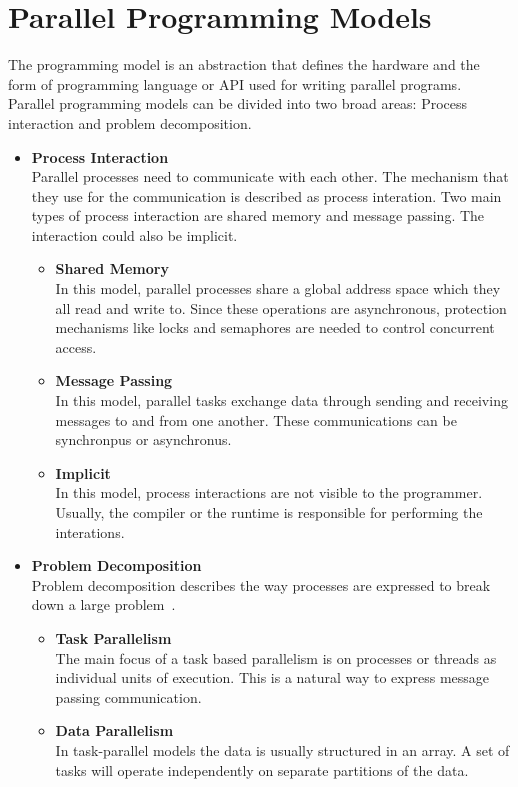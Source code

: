 \section{Parallel Programming Models}
The programming model is an abstraction that defines the hardware and the form of programming language or API used for writing parallel programs.
Parallel programming models can be divided into two broad areas: Process interaction and problem decomposition.~\cite{parallelprogrammingmodels}
\begin{itemize}
\item \textbf{Process Interaction}\\
  Parallel processes need to communicate with each other. The mechanism that they use for the communication is described as process interation. Two main types of process interaction are shared memory and message passing. The interaction could also be implicit.
  \begin{itemize}
  \item \textbf{Shared Memory}\\
    In this model, parallel processes share a global address space which they all read and write to. Since these operations are asynchronous, protection mechanisms like locks and semaphores are needed to control concurrent access.
  \item \textbf{Message Passing}\\
    In this model, parallel tasks exchange data through sending and receiving messages to and from one another. These communications can be synchronpus or asynchronus.
  \item \textbf{Implicit}\\
    In this model, process interactions are not visible to the programmer. Usually, the compiler or the runtime is responsible for performing the interations.
  \end{itemize}
\item \textbf{Problem Decomposition}\\
Problem decomposition describes the way processes are expressed to break down a large problem~\cite{Quinn:2003:PPC:1211440}.
  \begin{itemize}
  \item \textbf{Task Parallelism}\\
    The main focus of a task based parallelism is on processes or threads as individual units of execution. This is a natural way to express message passing communication.
  \item \textbf{Data Parallelism}\\
    In task-parallel models the data is usually structured in an array. A set of tasks will operate independently on separate partitions of the data.     
  \end{itemize}
\end{itemize}


